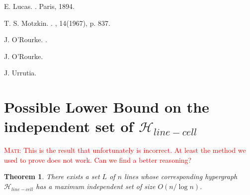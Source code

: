 \documentclass[11pt,a4paper]{article}
\newtheorem{theorem}{Theorem}
\newcommand{\Hlinecell}{{\mathcal H}_{line-cell}}
\newcommand{\Hcellzone}{{\mathcal H}_{cell-zone}}
\newcommand{\mati}[1]{\textcolor{red}{\textsc{Mati:} #1}}
\newcommand{\sholong}[2]{#2}
\newcommand{\proofguardwithcells}{The first iterations of the algorithm select cells that each cover four new lines. 
We iteratively select a cell covering four lines as long as the average number of segments of uncovered lines bounding a cell is strictly greater than three. The total number of segments is $n^2$, and each contribute to two cells. Every selected cell discards four lines, and exactly $4\times 2n=8n$ segments of those. If the cell is bounded by more than four lines, we only discard exactly four of them, arbitrarily. The total number of cells after the $i$th iteration is $|C|-i$. The number of iterations is the largest value $i$ that satisfies:
\begin{eqnarray*}
\frac{2n^2 - 8in}{|C|-i} & > & 3, \\
\frac{2n^2 - 8in}{n(n+1)/2 +1 -i} & > & 3, \\
i & \sim & \frac n{16} +o(n) .
\end{eqnarray*}
Hence we can select roughly $\frac n{16}$ cells, covering together $\frac n4$ lines.

In the second phase of the algorithm, we iteratively select cells covering three new lines. Following the same reasoning, and taking into account the $i\simeq n/16$ previously selected cells, we know that the number $j$ of iterations satisfies:
\begin{eqnarray*}
\frac{2n^2 - 8in - 6jn}{|C| -i -j} & > & 2, \\
\frac{2n^2 - n^2/2 - 6jn}{n(n+1)/2 +1 -n/16 -j} & > & 2, \\
j & \sim & \frac n{12} +o(n).
\end{eqnarray*}
Hence we can select roughly $\frac n{12}$ more cells, covering together $\frac n4$ lines.

Overall, we now have $\frac n{16}+\frac n{12} + o(n)$ cells covering $\frac n2$ lines. It remains to cover the remaining $\frac n2$ lines with $\frac n4$ cells, each covering two lines, as in Theorem~\ref{warmup:guardwithcells}. The total number of cells is therefore
\begin{equation*}
\frac n{16}+\frac n{12} + \frac n4 + o(n) = \frac{19}{48} n +o(n).
\end{equation*}}
\begin{document}
{\begin{thebibliography}{1}
 E. Lucas.
. Paris, 1894.


 T. S. Motzkin.
.
, 14(1967), p. 837.

 J. O'Rourke.
.


 J. O'Rourke.

  J. Urrutia.

\end{thebibliography}
}
\sholong{
\appendix
\section{Proofs omitted from the Document}

\newtheorem*{guardwithcells}{Theorem \ref{guardwithcells}}
\begin{guardwithcells}
Given any set $L$ of $n$ lines, a minimal vertex cover of the corresponding $\Hcellzone$ hypergraph has size at most ${19n \over 48} +o(n)$. Moreover, there exists a set $L$ of $n$ lines, such that every vertex cover of the corresponding $\Hcellzone$ hypergraph has size at least ${n \over 4}$.
\end{guardwithcells}
\begin{proof}
Proof of the lower bound was given in the main document, hence we focus in the upper bound. \proofguardwithcells
\end{proof}
}{}
\iffalse
\newpage
\appendix
\section{Possible Lower Bound on the independent set of $\Hlinecell$}
\mati{This is the result that unfortunately is incorrect. At least the method we used to prove does not work. Can we find a better reasoning?}

\begin{theorem}\label{Athe:ubis}
There exists a set $L$ of $n$ lines whose corresponding hypergraph $\Hlinecell$ has a  maximum independent set of size $O(n/\log n)$.
\end{theorem}
\end{document}
